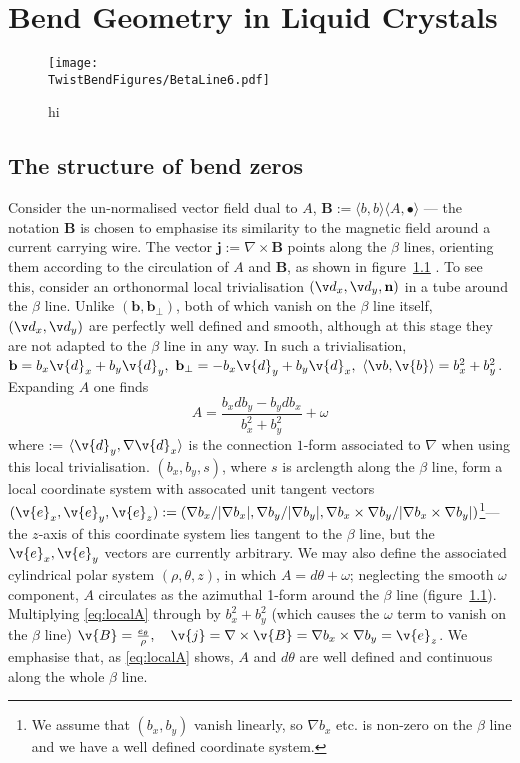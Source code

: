 \chapter{Bend Geometry in Liquid Crystals}
\label{ch:TwistBend}
\begin{figure}[htbp]
    \centering
    \texttt{[image: \\TwistBendFigures/BetaLine6.pdf]}
    \caption{hi}
    \label{fig:BetaLines}
\end{figure}
\section{The structure of bend zeros}

Consider the un-normalised vector field dual to $A$, $\mathbf{B} := \langle b,b \rangle \langle A, \bullet \rangle$ --- the notation $\mathbf{B}$ is chosen to emphasise its similarity to the magnetic field around a current carrying wire. The vector $\mathbf{j} := \nabla \times \mathbf{B}$ points along the $\beta$ lines, orienting them according to the circulation of $A$ and $\mathbf{B}$, as shown in figure~\ref{fig:BetaLines} \cite{MachonThesis}. To see this, consider an orthonormal local trivialisation $(\v d_x, \v d_y,\bf n)$ in a tube around the $\beta$ line. Unlike $(\mathbf{b}, \mathbf{b}_\perp)$, both of which vanish on the $\beta$ line itself, $(\v d_x, \v d_y)$ are perfectly well defined and smooth, although at this stage they are not adapted to the $\beta$ line in any way. In such a trivialisation, ${\bf b} = b_x \v{d}_x + b_y \v{d}_y,\ {\bf b}_\perp = -b_x \v{d}_y + b_y \v{d}_x,\ \langle \v b, \v{b} \rangle = b_x^2 + b_y^2$. Expanding $A$ one finds
\begin{equation}
    A = \frac{b_x d b_y - b_y d b_x}{b_x^2 + b_y^2}+ \omega
    \label{eq:localA}
\end{equation}
where \omega := $\langle \v{d}_y, \nabla \v{d}_x \rangle$ is the connection $1$-form associated to $\nabla$ when using this local trivialisation. $(b_x,b_y,s)$, where $s$ is arclength along the $\beta$ line, form a local coordinate system with assocated unit tangent vectors $(\v{e}_x, \v{e}_y, \v{e}_z) := (\nabla b_x/|\nabla b_x|, \nabla b_y/|\nabla b_y|,\nabla b_x \times \nabla b_y/|\nabla b_x \times \nabla b_y|)$\footnote{We assume that $(b_x, b_y)$ vanish linearly, so $\nabla b_x$ etc. is non-zero on the $\beta$ line and we have a well defined coordinate system.}--- the $z$-axis of this coordinate system lies tangent to the $\beta$ line, but the $\v{e}_x, \v{e}_y$ vectors are currently arbitrary. We may also define the associated cylindrical polar system $(\rho,\theta,z)$, in which $A = d\theta + \omega$; neglecting the smooth $\omega$ component, $A$ circulates as the azimuthal 1-form around the $\beta$ line (figure~\ref{fig:BetaLines}). Multiplying \eqref{eq:localA} through by $b_x^2 + b_y^2$ (which causes the $\omega$ term to vanish on the $\beta$ line) $\v{B} = \frac{e_\theta}{\rho}, \quad \v{j} = \nabla \times \v{B} =\nabla b_x \times \nabla b_y =  \v{e}_z$. We emphasise that, as \eqref{eq:localA} shows, $A$ and $d\theta$ are well defined and continuous along the whole $\beta$ line.


